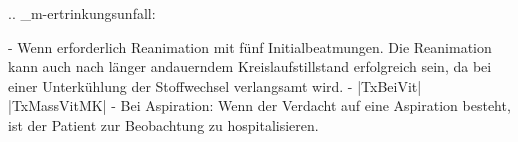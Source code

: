 
.. _m-ertrinkungsunfall:


\begin{itemize}
  -   Wenn erforderlich Reanimation mit fünf
  Initialbeatmungen. Die Reanimation kann auch nach länger
  andauerndem Kreislaufstillstand erfolgreich sein, da bei
  einer Unterkühlung der Stoffwechsel verlangsamt wird.
  -   |TxBeiVit| |TxMassVitMK|
  -   Bei Aspiration: Wenn der Verdacht auf eine
  Aspiration besteht, ist der Patient zur Beobachtung zu
  hospitalisieren.
\end{itemize}